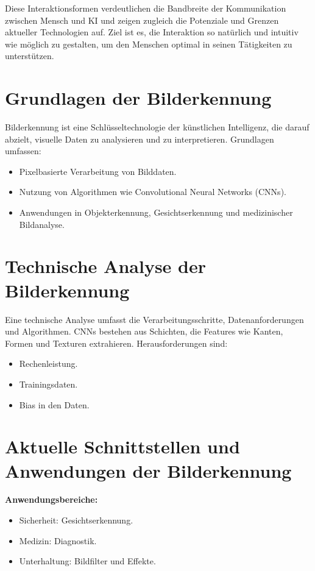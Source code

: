 \documentclass[a4paper,12pt]{article}
\begin{document}
Diese Interaktionsformen verdeutlichen die Bandbreite der Kommunikation zwischen Mensch und KI und zeigen zugleich die Potenziale und Grenzen aktueller Technologien auf. Ziel ist es, die Interaktion so natürlich und intuitiv wie möglich zu gestalten, um den Menschen optimal in seinen Tätigkeiten zu unterstützen.

\section{Grundlagen der Bilderkennung}

Bilderkennung ist eine Schlüsseltechnologie der künstlichen Intelligenz, die darauf abzielt, visuelle Daten zu analysieren und zu interpretieren. Grundlagen umfassen:
\begin{itemize}
    \item Pixelbasierte Verarbeitung von Bilddaten.
    \item Nutzung von Algorithmen wie Convolutional Neural Networks (CNNs).
    \item Anwendungen in Objekterkennung, Gesichtserkennung und medizinischer Bildanalyse.
\end{itemize}

\section{Technische Analyse der Bilderkennung}

Eine technische Analyse umfasst die Verarbeitungsschritte, Datenanforderungen und Algorithmen. CNNs bestehen aus Schichten, die Features wie Kanten, Formen und Texturen extrahieren. Herausforderungen sind:
\begin{itemize}
    \item Rechenleistung.
    \item Trainingsdaten.
    \item Bias in den Daten.
\end{itemize}

\section{Aktuelle Schnittstellen und Anwendungen der Bilderkennung}

\textbf{Anwendungsbereiche:}
\begin{itemize}
    \item Sicherheit: Gesichtserkennung.
    \item Medizin: Diagnostik.
    \item Unterhaltung: Bildfilter und Effekte.
\end{itemize}
\end{document}
